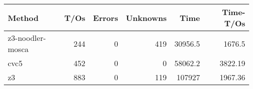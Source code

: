\begin{tabular}{lrrrrr}
\hline
 Method           &   T/Os &   Errors &   Unknowns &     Time &   Time-T/Os \\
\hline
 z3-noodler-mosca &    244 &        0 &        419 &  30956.5 &     1676.5  \\
 cvc5             &    452 &        0 &          0 &  58062.2 &     3822.19 \\
 z3               &    883 &        0 &        119 & 107927   &     1967.36 \\
\hline
\end{tabular}
